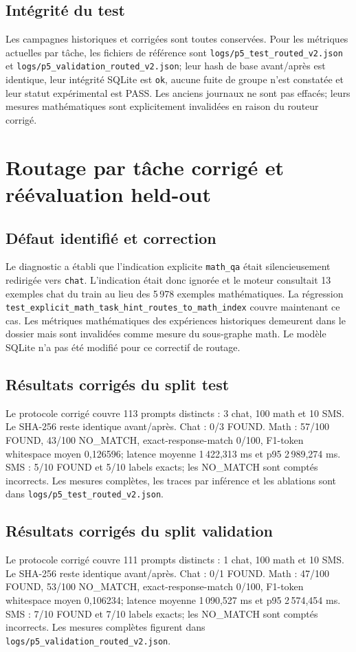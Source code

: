 \documentclass[11pt,a4paper,openany]{book}
\begin{document}
\section{Intégrité du test}
Les campagnes historiques et corrigées sont toutes conservées. Pour les métriques actuelles par tâche, les fichiers de référence sont \texttt{logs/p5\_test\_routed\_v2.json} et \texttt{logs/p5\_validation\_routed\_v2.json}; leur hash de base avant/après est identique, leur intégrité SQLite est \texttt{ok}, aucune fuite de groupe n'est constatée et leur statut expérimental est PASS. Les anciens journaux ne sont pas effacés; leurs mesures mathématiques sont explicitement invalidées en raison du routeur corrigé.

\chapter{Routage par tâche corrigé et réévaluation held-out}
\section{Défaut identifié et correction}
Le diagnostic a établi que l'indication explicite \texttt{math\_qa} était silencieusement redirigée vers \texttt{chat}. L'indication était donc ignorée et le moteur consultait 13 exemples chat du train au lieu des 5\,978 exemples mathématiques. La régression \texttt{test\_explicit\_math\_task\_hint\_routes\_to\_math\_index} couvre maintenant ce cas. Les métriques mathématiques des expériences historiques demeurent dans le dossier mais sont invalidées comme mesure du sous-graphe math. Le modèle SQLite n'a pas été modifié pour ce correctif de routage.

\section{Résultats corrigés du split test}
Le protocole corrigé couvre 113 prompts distincts : 3 chat, 100 math et 10 SMS. Le SHA-256 reste identique avant/après. Chat : 0/3 FOUND. Math : 57/100 FOUND, 43/100 NO\_MATCH, exact-response-match 0/100, F1-token whitespace moyen 0,126596; latence moyenne 1\,422,313 ms et p95 2\,989,274 ms. SMS : 5/10 FOUND et 5/10 labels exacts; les NO\_MATCH sont comptés incorrects. Les mesures complètes, les traces par inférence et les ablations sont dans \texttt{logs/p5\_test\_routed\_v2.json}.

\section{Résultats corrigés du split validation}
Le protocole corrigé couvre 111 prompts distincts : 1 chat, 100 math et 10 SMS. Le SHA-256 reste identique avant/après. Chat : 0/1 FOUND. Math : 47/100 FOUND, 53/100 NO\_MATCH, exact-response-match 0/100, F1-token whitespace moyen 0,106234; latence moyenne 1\,090,527 ms et p95 2\,574,454 ms. SMS : 7/10 FOUND et 7/10 labels exacts; les NO\_MATCH sont comptés incorrects. Les mesures complètes figurent dans \texttt{logs/p5\_validation\_routed\_v2.json}.
\end{document}

